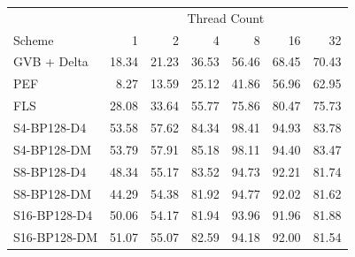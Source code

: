 \begin{tabular}{lrrrrrr}
\toprule
 & \multicolumn{6}{c}{Thread Count} \\
Scheme & 1 & 2 & 4 & 8 & 16 & 32 \\
\midrule
GVB + Delta & 18.34 & 21.23 & 36.53 & 56.46 & 68.45 & 70.43 \\
PEF & 8.27 & 13.59 & 25.12 & 41.86 & 56.96 & 62.95 \\
FLS & 28.08 & 33.64 & 55.77 & 75.86 & 80.47 & 75.73 \\
S4-BP128-D4 & 53.58 & 57.62 & 84.34 & 98.41 & 94.93 & 83.78 \\
S4-BP128-DM & 53.79 & 57.91 & 85.18 & 98.11 & 94.40 & 83.47 \\
S8-BP128-D4 & 48.34 & 55.17 & 83.52 & 94.73 & 92.21 & 81.74 \\
S8-BP128-DM & 44.29 & 54.38 & 81.92 & 94.77 & 92.02 & 81.62 \\
S16-BP128-D4 & 50.06 & 54.17 & 81.94 & 93.96 & 91.96 & 81.88 \\
S16-BP128-DM & 51.07 & 55.07 & 82.59 & 94.18 & 92.00 & 81.54 \\
\bottomrule
\end{tabular}

